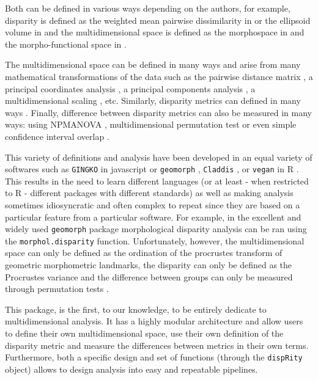 \documentclass[12pt,letterpaper]{article}
\newcommand{\disp}{\texttt{dispRity} }
\begin{document}
Both can be defined in various ways depending on the authors, for example, disparity is defined as the weighted mean pairwise dissimilarity in \cite{Close2015} or the ellipsoid volume in \cite{DonohueDim} and the multidimensional space is defined as the morphospace in \cite{raup1966geometric} and the morpho-functional space in \cite{diaz2016global}.




The multidimensional space can be defined in many ways and arise from many mathematical transformations of the data such as the pairwise distance matrix \citep{Close2015}, a principal coordinates analysis \citep[PCO;][]{Brusatte12092008}, a principal components analysis \citep[PCA;][]{zelditch2012geometric}, a multidimensional scaling \citep[MDS;][]{DonohueDim}, etc.
Similarly, disparity metrics \citep[or indices;][]{Hopkins2017} can defined in many ways \citep[e.g.][or combinations thereof]{Wills2001,Ciampaglio2001,foth2012different,DonohueDim,Hughes20082013,finlay2015morphological,Close2015,diaz2016global}.
Finally, difference between disparity metrics can also be measured in many ways: using NPMANOVA \citep[e.g.][]{Brusatte12092008}, multidimensional permutation test \citep[e.g.][]{diaz2016global} or even simple confidence interval overlap \citep[e.g.][]{halliday2016eutherian}.

This variety of definitions and analysis have been developed in an equal variety of softwares such as \texttt{GINGKO} in javascript \citep{bouxin2005ginkgo,de2007ginkgo} or \texttt{geomorph} \citep{adams2013geomorph,adams2017geometric}, \texttt{Claddis} \citep{Claddis}, or \texttt{vegan} \citep{oksanen2007vegan} in R \citep{R}.
This results in the need to learn different languages (or at least - when restricted to R - different packages with different standards) as well as making analysis sometimes idiosyncratic and often complex to repeat since they are based on a particular feature from a particular software.
For example, in the excellent and widely used \texttt{geomorph} package morphological disparity analysis can be ran using the \texttt{morphol.disparity} function.
Unfortunately, however, the multidimensional space can only be defined as the ordination of the procrustes transform of geometric morphometric landmarks, the disparity can only be defined as the Procrustes variance and the difference between groups can only be measured through permutation tests \citep{zelditch2012geometric,adams2013geomorph,adams2017geometric}.

This package, is the first, to our knowledge, to be entirely dedicate to multidimensional analysis.
It has a highly modular architecture and allow users to define their own multidimensional space, use their own definition of the disparity metric and measure the differences between metrics in their own terms.
Furthermore, both a specific design and set of functions (through the \disp object) allows to design analysis into easy and repeatable pipelines.
\end{document}
